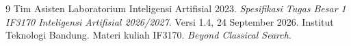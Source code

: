\begin{thebibliography}{9}
 Tim Asisten Laboratorium Inteligensi Artifisial 2023.
\textit{Spesifikasi Tugas Besar 1 IF3170 Inteligensi Artifisial 2026/2027}.
Versi 1.4, 24 September 2026. Institut Teknologi Bandung.
 Materi kuliah IF3170.
\textit{Beyond Classical Search}. 
\end{thebibliography}
